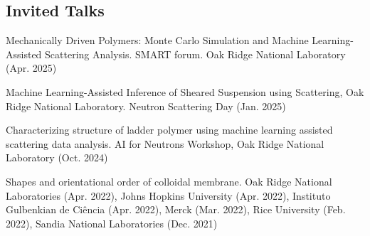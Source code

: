 \documentclass[11pt,letterpaper]{article}
\begin{document}
\subsection*{Invited Talks}
\begin{etaremune}
    \item Mechanically Driven Polymers: Monte Carlo Simulation and Machine Learning-Assisted Scattering Analysis. SMART forum. Oak Ridge National Laboratory (Apr. 2025)
    \item Machine Learning-Assisted Inference of Sheared Suspension using Scattering, Oak Ridge National Laboratory. Neutron Scattering Day (Jan. 2025)
    \item Characterizing structure of ladder polymer using machine learning assisted scattering data analysis. AI for Neutrons Workshop, Oak Ridge National Laboratory (Oct. 2024)
    \item Shapes and orientational order of colloidal membrane. Oak Ridge National Laboratories (Apr. 2022), Johns Hopkins University (Apr. 2022), Instituto Gulbenkian de Ciência (Apr. 2022), Merck (Mar. 2022), Rice University (Feb. 2022), Sandia National Laboratories (Dec. 2021)
\end{etaremune}
\end{document}
